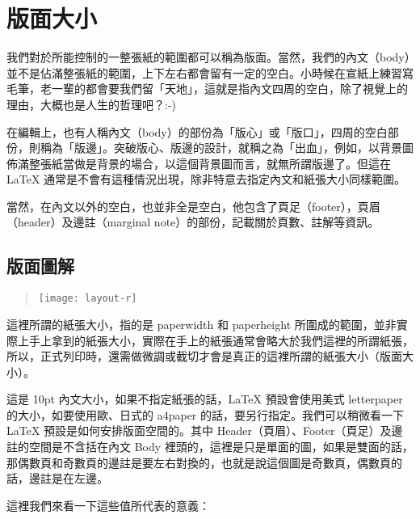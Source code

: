 \section{版面大小}
\label{sec:layout}

我們對於所能控制的一整張紙的範圍都可以稱為版面。當然，我們的內文（body）並不是佔滿整張紙的範圍，上下左右都會留有一定的空白。小時候在宣紙上練習寫毛筆，老一輩的都會要我們留「天地」，這就是指內文四周的空白，除了視覺上的理由，大概也是人生的哲理吧？:-)

在編輯上，也有人稱內文（body）的部份為「版心」或「版口」，四周的空白部份，則稱為「版邊」。突破版心、版邊的設計，就稱之為「出血」，例如，以背景圖佈滿整張紙當做是背景的場合，以這個背景圖而言，就無所謂版邊了。但這在 \LaTeX{} 通常是不會有這種情況出現，除非特意去指定內文和紙張大小同樣範圍。

當然，在內文以外的空白，也並非全是空白，他包含了頁足（footer），頁眉（header）及邊註（marginal note）的部份，記載關於頁數、註解等資訊。

\subsection{版面圖解}
\label{subsec:layout}

\begin{quote}
   \begin{center}
      \texttt{[image: layout-r]}
   \end{center}
\end{quote}

這裡所謂的紙張大小，指的是 {\ttfamily paperwidth} 和 {\ttfamily paperheight} 所圍成的範圍，並非實際上手上拿到的紙張大小，實際在手上的紙張通常會略大於我們這裡的所謂紙張，所以，正式列印時，還需做微調或截切才會是真正的這裡所謂的紙張大小（版面大小）。

這是 10pt 內文大小，如果不指定紙張的話，\LaTeX{} 預設會使用美式 {\ttfamily letterpaper} 的大小，如要使用歐、日式的 {\ttfamily a4paper} 的話，要另行指定。我們可以稍微看一下 \LaTeX{} 預設是如何安排版面空間的。其中 Header（頁眉）、Footer（頁足）及邊註的空間是不含括在內文 Body 裡頭的，這裡是只是單面的圖，如果是雙面的話，那偶數頁和奇數頁的邊註是要左右對換的，也就是說這個圖是奇數頁，偶數頁的話，邊註是在左邊。

這裡我們來看一下這些值所代表的意義：

